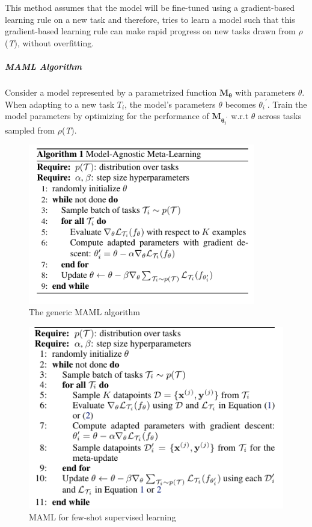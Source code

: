 This method assumes that the model will be fine-tuned using a gradient-based learning rule on a new task and therefore,  tries to learn a model such that this gradient-based learning rule can make rapid progress on new tasks drawn from $\rho$(\textit{T}), without overfitting.
\subparagraph{MAML Algorithm}
Consider a model represented by a parametrized function $\mathbf{M_\theta}$ with parameters $\theta$. When adapting to a new task $\textit{T}_i$, the model's parameters $\theta$ becomes ${\theta_i}^\prime$. Train the model parameters by optimizing for the performance of $\mathbf{M_{{\theta_i}^\prime}}$ w.r.t $\theta$ across tasks sampled from $\rho$(\textit{T}). \\

\begin{figure}
\includegraphics[height=7cm,width=\textwidth,keepaspectratio]{maml_1.png}
\caption{\label{fig:MAML}The generic MAML algorithm}
\end{figure}

\begin{figure}[!ht]
\includegraphics[height=8cm,width=\textwidth,keepaspectratio]{maml_2.png}
\caption{\label{fig:MAML2}MAML for few-shot supervised learning}
\end{figure}

